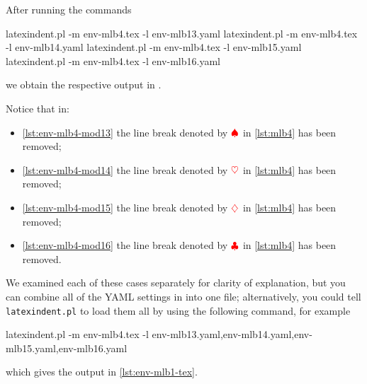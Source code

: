 	After running the commands
	\begin{commandshell}
latexindent.pl -m env-mlb4.tex -l env-mlb13.yaml
latexindent.pl -m env-mlb4.tex -l env-mlb14.yaml
latexindent.pl -m env-mlb4.tex -l env-mlb15.yaml
latexindent.pl -m env-mlb4.tex -l env-mlb16.yaml
\end{commandshell}

	we obtain the respective output in .

	\begin{minipage}{.45\linewidth}
	\end{minipage}
	\hfill
	\begin{minipage}{.45\linewidth}
	\end{minipage}

	\begin{minipage}{.45\linewidth}
	\end{minipage}
	\hfill
	\begin{minipage}{.45\linewidth}
	\end{minipage}

	Notice that in:
	\begin{itemize}
		\item \cref{lst:env-mlb4-mod13} the line break denoted by $\color{red}\spadesuit$ in
		      \cref{lst:mlb4} has been removed;
		\item \cref{lst:env-mlb4-mod14} the line break denoted by $\color{red}\heartsuit$ in
		      \cref{lst:mlb4} has been removed;
		\item \cref{lst:env-mlb4-mod15} the line break denoted by $\color{red}\diamondsuit$ in
		      \cref{lst:mlb4} has been removed;
		\item \cref{lst:env-mlb4-mod16} the line break denoted by $\color{red}\clubsuit$ in
		      \cref{lst:mlb4} has been removed.
	\end{itemize}
	We examined each of these cases separately for clarity of explanation, but you can
	combine all of the YAML settings in  into one file;
	alternatively, you could tell \texttt{latexindent.pl} to load them all by using the
	following command, for example
	\begin{widepage}
		\begin{commandshell}
latexindent.pl -m env-mlb4.tex -l env-mlb13.yaml,env-mlb14.yaml,env-mlb15.yaml,env-mlb16.yaml
\end{commandshell}
	\end{widepage}
	which gives the output in \vref{lst:env-mlb1-tex}.

